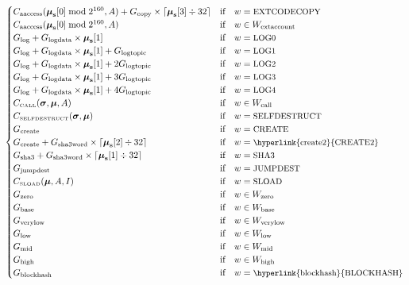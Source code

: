 \documentclass[9pt,oneside]{amsart}
\begin{document}
\begin{equation}
\begin{cases}
C_{\mathrm{aaccess}}(\boldsymbol{\mu}_{\mathbf{s}}[0] \bmod 2^{160}, A) + G_{\mathrm{copy}}\times\lceil\boldsymbol{\mu}_{\mathbf{s}}[3] \div 32\rceil & \text{if} \quad w = \text{\small EXTCODECOPY} \\
C_{\mathrm{aaccess}}(\boldsymbol{\mu}_{\mathbf{s}}[0] \bmod 2^{160}, A) & \text{if} \quad w \in W_{\mathrm{extaccount}}\\
G_{\mathrm{log}}+G_{\mathrm{logdata}}\times\boldsymbol{\mu}_{\mathbf{s}}[1] & \text{if} \quad w = \text{\small LOG0} \\
G_{\mathrm{log}}+G_{\mathrm{logdata}}\times\boldsymbol{\mu}_{\mathbf{s}}[1]+G_{\mathrm{logtopic}} & \text{if} \quad w = \text{\small LOG1} \\
G_{\mathrm{log}}+G_{\mathrm{logdata}}\times\boldsymbol{\mu}_{\mathbf{s}}[1]+2G_{\mathrm{logtopic}} & \text{if} \quad w = \text{\small LOG2} \\
G_{\mathrm{log}}+G_{\mathrm{logdata}}\times\boldsymbol{\mu}_{\mathbf{s}}[1]+3G_{\mathrm{logtopic}} & \text{if} \quad w = \text{\small LOG3} \\
G_{\mathrm{log}}+G_{\mathrm{logdata}}\times\boldsymbol{\mu}_{\mathbf{s}}[1]+4G_{\mathrm{logtopic}} & \text{if} \quad w = \text{\small LOG4} \\
C_\text{\tiny CALL}(\boldsymbol{\sigma}, \boldsymbol{\mu}, A) & \text{if} \quad w \in W_{\mathrm{call}} \\
C_\text{\tiny SELFDESTRUCT}(\boldsymbol{\sigma}, \boldsymbol{\mu}) & \text{if} \quad w = \text{\small SELFDESTRUCT} \\
G_{\mathrm{create}} & \text{if} \quad w = \text{\small CREATE}\\
G_{\mathrm{create}}+G_{\mathrm{sha3word}} \times \lceil \boldsymbol{\mu}_{\mathbf{s}}[2] \div 32 \rceil & \text{if} \quad w = \text{\small \hyperlink{create2}{CREATE2}}\\
G_{\mathrm{sha3}}+G_{\mathrm{sha3word}} \times \lceil \boldsymbol{\mu}_{\mathbf{s}}[1] \div 32 \rceil & \text{if} \quad w = \text{\small SHA3}\\
G_{\mathrm{jumpdest}} & \text{if} \quad w = \text{\small JUMPDEST}\\
C_\text{\tiny SLOAD}(\boldsymbol{\mu}, A, I) & \text{if} \quad w = \text{\small SLOAD}\\
G_{\mathrm{zero}} & \text{if} \quad w \in W_{\mathrm{zero}}\\
G_{\mathrm{base}} & \text{if} \quad w \in W_{\mathrm{base}}\\
G_{\mathrm{verylow}} & \text{if} \quad w \in W_{\mathrm{verylow}}\\
G_{\mathrm{low}} & \text{if} \quad w \in W_{\mathrm{low}}\\
G_{\mathrm{mid}} & \text{if} \quad w \in W_{\mathrm{mid}}\\
G_{\mathrm{high}} & \text{if} \quad w \in W_{\mathrm{high}}\\
G_{\mathrm{blockhash}} & \text{if} \quad w = \text{\small \hyperlink{blockhash}{BLOCKHASH}}\\
\end{cases}
\end{equation}
\end{document}
